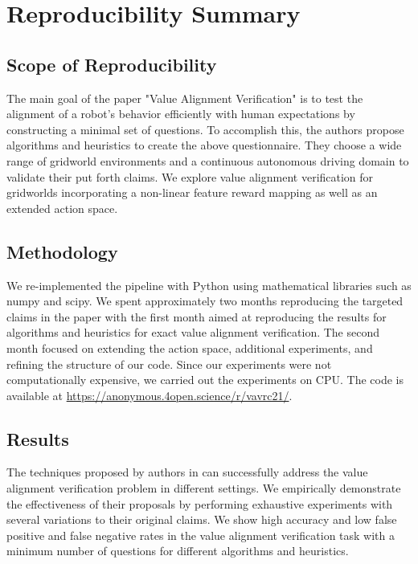 \newtheorem{thm}{Theorem}
\newtheorem{corollary}{Corollary}
\newtheorem{defn}{Definition}
\newtheorem{lemma}{Lemma}
\newtheorem{case}{Case}


\section*{\centering Reproducibility Summary}

\subsection*{Scope of Reproducibility}
The main goal of the paper "Value Alignment Verification" \cite{brown2021value} is to test the alignment of a robot's behavior efficiently with human expectations by constructing a minimal set of questions. To accomplish this, the authors propose algorithms and heuristics to create the above questionnaire. They choose a wide range of gridworld environments and a continuous autonomous driving domain to validate their put forth claims. We explore value alignment verification for gridworlds incorporating a non-linear feature reward mapping as well as an extended action space.

\subsection*{Methodology}

We re-implemented the pipeline with Python using mathematical libraries such as \\ numpy and scipy. We spent approximately two months reproducing the targeted claims in the paper with the first month aimed at  reproducing the results for algorithms and heuristics for exact value alignment verification. The second month focused on extending  the action space, additional experiments, and refining the structure of our code. Since our experiments were not computationally  expensive, we carried out the experiments on CPU. The code is available at {\url{https://anonymous.4open.science/r/vavrc21/}}.

\subsection*{Results}
The techniques proposed by authors in \cite{brown2021value} can successfully address the value alignment verification problem in different settings. We empirically demonstrate the effectiveness of their proposals by performing exhaustive experiments with several variations to their original claims. We show high accuracy and low false positive and false negative rates in the value alignment verification task with a minimum number of questions for different algorithms and heuristics.

